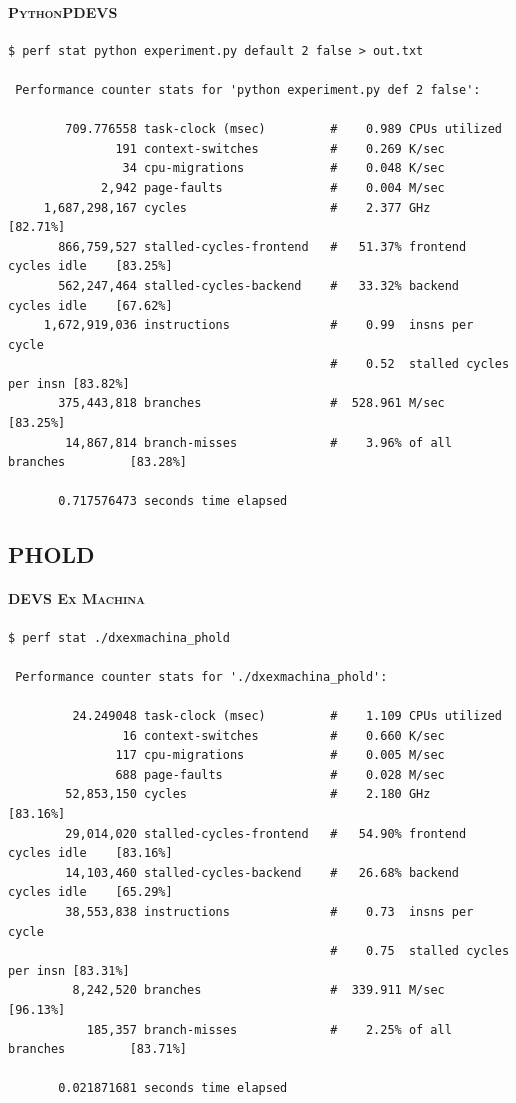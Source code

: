 \documentclass[8pt,a4paper]{report}
\begin{document}
\paragraph{\textsc{PythonPDEVS}}
\begin{Verbatim}[fontsize=\small]
$ perf stat python experiment.py default 2 false > out.txt

 Performance counter stats for 'python experiment.py def 2 false':

        709.776558 task-clock (msec)         #    0.989 CPUs utilized          
               191 context-switches          #    0.269 K/sec                  
                34 cpu-migrations            #    0.048 K/sec                  
             2,942 page-faults               #    0.004 M/sec                  
     1,687,298,167 cycles                    #    2.377 GHz                     [82.71%]
       866,759,527 stalled-cycles-frontend   #   51.37% frontend cycles idle    [83.25%]
       562,247,464 stalled-cycles-backend    #   33.32% backend  cycles idle    [67.62%]
     1,672,919,036 instructions              #    0.99  insns per cycle        
                                             #    0.52  stalled cycles per insn [83.82%]
       375,443,818 branches                  #  528.961 M/sec                   [83.25%]
        14,867,814 branch-misses             #    3.96% of all branches         [83.28%]

       0.717576473 seconds time elapsed
\end{Verbatim}
\subsection{PHOLD}
\paragraph{\textsc{DEVS Ex Machina}}
\begin{Verbatim}[fontsize=\small]
$ perf stat ./dxexmachina_phold 

 Performance counter stats for './dxexmachina_phold':

         24.249048 task-clock (msec)         #    1.109 CPUs utilized          
                16 context-switches          #    0.660 K/sec                  
               117 cpu-migrations            #    0.005 M/sec                  
               688 page-faults               #    0.028 M/sec                  
        52,853,150 cycles                    #    2.180 GHz                     [83.16%]
        29,014,020 stalled-cycles-frontend   #   54.90% frontend cycles idle    [83.16%]
        14,103,460 stalled-cycles-backend    #   26.68% backend  cycles idle    [65.29%]
        38,553,838 instructions              #    0.73  insns per cycle        
                                             #    0.75  stalled cycles per insn [83.31%]
         8,242,520 branches                  #  339.911 M/sec                   [96.13%]
           185,357 branch-misses             #    2.25% of all branches         [83.71%]

       0.021871681 seconds time elapsed
\end{Verbatim}
\end{document}
